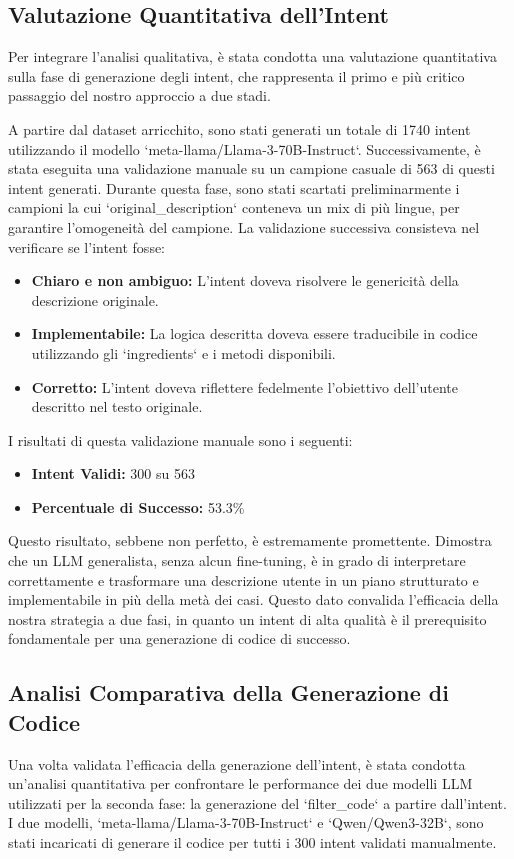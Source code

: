 \documentclass[sigconf,natbib=false]{acmart}
\begin{document}
\subsection{Valutazione Quantitativa dell'Intent}
Per integrare l'analisi qualitativa, è stata condotta una valutazione quantitativa sulla fase di generazione degli intent, che rappresenta il primo e più critico passaggio del nostro approccio a due stadi.

A partire dal dataset arricchito, sono stati generati un totale di 1740 intent utilizzando il modello `meta-llama/Llama-3-70B-Instruct`. Successivamente, è stata eseguita una validazione manuale su un campione casuale di 563 di questi intent generati. Durante questa fase, sono stati scartati preliminarmente i campioni la cui `original\_description` conteneva un mix di più lingue, per garantire l'omogeneità del campione. La validazione successiva consisteva nel verificare se l'intent fosse:
\begin{itemize}
    \item \textbf{Chiaro e non ambiguo:} L'intent doveva risolvere le genericità della descrizione originale.
    \item \textbf{Implementabile:} La logica descritta doveva essere traducibile in codice utilizzando gli `ingredients` e i metodi disponibili.
    \item \textbf{Corretto:} L'intent doveva riflettere fedelmente l'obiettivo dell'utente descritto nel testo originale.
\end{itemize}

I risultati di questa validazione manuale sono i seguenti:
\begin{itemize}
    \item \textbf{Intent Validi:} 300 su 563
    \item \textbf{Percentuale di Successo:} 53.3\%
\end{itemize}

Questo risultato, sebbene non perfetto, è estremamente promettente. Dimostra che un LLM generalista, senza alcun fine-tuning, è in grado di interpretare correttamente e trasformare una descrizione utente in un piano strutturato e implementabile in più della metà dei casi. Questo dato convalida l'efficacia della nostra strategia a due fasi, in quanto un intent di alta qualità è il prerequisito fondamentale per una generazione di codice di successo.

\subsection{Analisi Comparativa della Generazione di Codice}
Una volta validata l'efficacia della generazione dell'intent, è stata condotta un'analisi quantitativa per confrontare le performance dei due modelli LLM utilizzati per la seconda fase: la generazione del `filter\_code` a partire dall'intent. I due modelli, `meta-llama/Llama-3-70B-Instruct` e `Qwen/Qwen3-32B`, sono stati incaricati di generare il codice per tutti i 300 intent validati manualmente.
\end{document}
